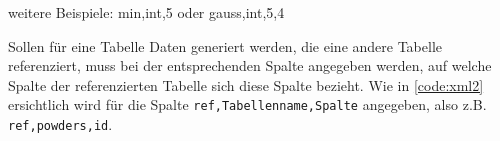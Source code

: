 \documentclass[11pt]{report}
\begin{document}
weitere Beispiele: min,int,5 oder gauss,int,5,4

\bigskip\noindent
Sollen für eine Tabelle Daten generiert werden, die eine andere Tabelle referenziert, muss bei der entsprechenden Spalte angegeben werden, auf welche Spalte der referenzierten Tabelle sich diese Spalte bezieht. Wie in \autoref{code:xml2} ersichtlich wird für die Spalte \texttt{ref,Tabellenname,Spalte} angegeben, also z.B. \texttt{ref,powders,id}.

\begin{figure}[h]
	\centering
	\begin{minipage}{0.9\textwidth}
		
	\end{minipage}
\end{figure}
\end{document}
